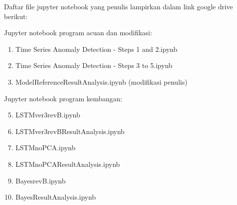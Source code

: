 \documentclass[12pt, a4paper, onecolumn, oneside, final]{report}
\begin{document}
    Daftar file jupyter notebook yang penulis lampirkan dalam link google drive berikut:

    Jupyter notebook program acuan dan modifikasi:
    \begin{enumerate}[label=\textbf{L.\arabic*}]
        \item Time Series Anomaly Detection -  Steps 1 and 2.ipynb
        \item Time Series Anomaly Detection - Steps 3 to 5.ipynb
        \item Model\textunderscore Reference\textunderscore Result\textunderscore Analysis.ipynb (modifikasi penulis) \label{refmodified_ipynb}
    \end{enumerate}

    Jupyter notebook program kembangan:
    \begin{enumerate}[label=\textbf{L.\arabic*}]
        \setcounter{enumi}{4}
        \item LSTM\textunderscore ver3\textunderscore revB.ipynb \label{lstm_pca_ipynb}
        \item LSTM\textunderscore ver3\textunderscore revB\textunderscore Result\textunderscore Analysis.ipynb \label{lstm_pca_res_ipynb}
        \item LSTM\textunderscore noPCA.ipynb \label{lstm_nopca_ipynb}
        \item LSTM\textunderscore noPCA\textunderscore Result\textunderscore Analysis.ipynb \label{lstm_pca_res_ipynb}
        \item Bayes\textunderscore revB.ipynb \label{bayes_ipynb}
        \item Bayes\textunderscore Result\textunderscore Analysis.ipynb \label{lstm_pca_res_ipynb}
    \end{enumerate}


\end{document}
